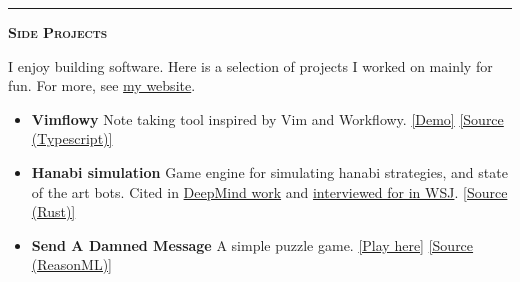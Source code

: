 \documentclass[11 pt]{article}
\begin{document}
\hrule

\begin{center}\begin{Large}\textsc{\textbf{Side Projects}\\}\end{Large}\end{center}

I enjoy building software.  Here is a selection of projects I worked on mainly for fun.
For more, see \href{https://www.wuthejeff.com/projects}{my website}.


\begin{itemize}
\item \textbf{Vimflowy}
Note taking tool inspired by Vim and Workflowy. \href{https://www.wuthejeff.com/vimflowy}{[Demo]} \href{https://github.com/WuTheFWasThat/vimflowy}{[Source (Typescript)]}

\item \textbf{Hanabi simulation}
Game engine for simulating hanabi strategies, and state of the art bots.  Cited in \href{https://arxiv.org/abs/1902.00506}{DeepMind work} and \href{https://www.wsj.com/articles/why-the-card-game-hanabi-is-the-next-big-hurdle-for-artificial-intelligence-11553875351}{interviewed for in WSJ}. \href{https://github.com/WuTheFWasThat/hanabi.rs}{[Source (Rust)]}



\item \textbf{Send A Damned Message}
  A simple puzzle game.
\href{https://www.wuthejeff.com/send-a-damned-message}{[Play here]}
\href{https://github.com/WuTheFWasThat/send-a-damned-message}{[Source (ReasonML)]}





\end{itemize}
\end{document}
